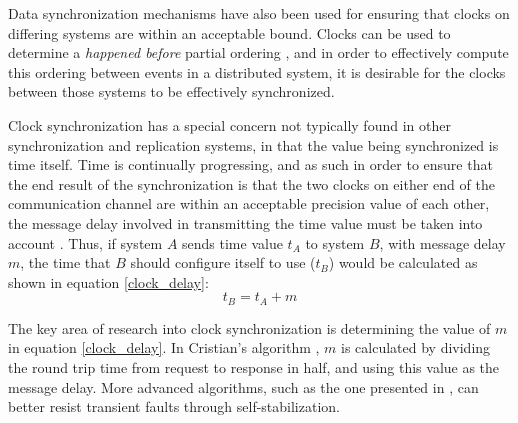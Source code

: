 Data synchronization mechanisms have also been used for ensuring that clocks on differing systems are within an acceptable bound.  Clocks can be used to determine a \emph{happened before} partial ordering \cite{359563}, and in order to effectively compute this ordering between events in a distributed system, it is desirable for the clocks between those systems to be effectively synchronized.

Clock synchronization has a special concern not typically found in other synchronization and replication systems, in that the value being synchronized is time itself.  Time is continually progressing, and as such in order to ensure that the end result of the synchronization is that the two clocks on either end of the communication channel are within an acceptable precision value of each other, the message delay involved in transmitting the time value must be taken into account \cite{RefWorks:37}.  Thus, if system $A$ sends time value $t_A$ to system $B$, with message delay $m$, the time that $B$ should configure itself to use ($t_B$) would be calculated as shown in equation \ref{clock_delay}:
\begin{equation}
t_B = t_A + m
\label{clock_delay}
\end{equation}

The key area of research into clock synchronization is determining the value of $m$ in equation \ref{clock_delay}.  In Cristian's algorithm \cite{RefWorks:37}, $m$ is calculated by dividing the round trip time from request to response in half, and using this value as the message delay.  More advanced algorithms, such as the one presented in \cite{1017463}, can better resist transient faults through self-stabilization.
